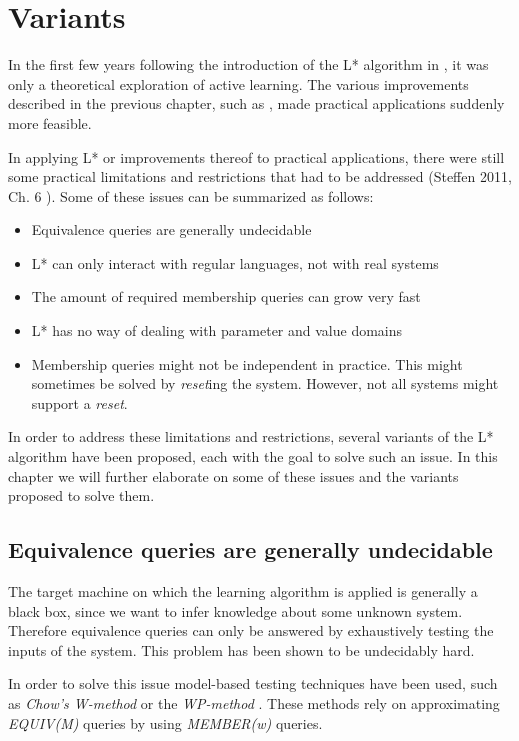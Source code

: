 \documentclass[multi,crop=false,class=article]{standalone}
\begin{document}
\section{Variants}
\label{sec:variants}
In the first few years following the introduction of the L* algorithm in
\cite{Angluin87}, it was only a theoretical exploration of active learning.
The various improvements described in the previous chapter,
such as ,
made practical applications suddenly more feasible.

In applying L* or improvements thereof to practical applications,
there were still some practical limitations and restrictions that had to
be addressed (Steffen 2011, Ch. 6 \cite{Steffen11}).
Some of these issues can be summarized as follows:
\begin{itemize}
  \item Equivalence queries are generally undecidable
  \item L* can only interact with regular languages, not with real systems
  \item The amount of required membership queries can grow very fast
  \item L* has no way of dealing with parameter and value domains
  \item Membership queries might not be independent in practice.
        This might sometimes be solved by \textit{reset}ing the system.
        However, not all systems might support a \textit{reset}.
\end{itemize}

In order to address these limitations and restrictions,
several variants of the L* algorithm have been proposed,
each with the goal to solve such an issue.
In this chapter we will further elaborate on some of these issues
and the variants proposed to solve them.

\subsection{Equivalence queries are generally undecidable}
The target machine on which the learning algorithm is applied is generally
a black box, since we want to infer knowledge about some unknown system.
Therefore equivalence queries can only be answered by exhaustively testing
the inputs of the system. This problem has been shown to be undecidably hard.

In order to solve this issue model-based testing techniques have been used,
such as \textit{Chow's W-method} or the \textit{WP-method} .
These methods rely on approximating \textit{EQUIV(M)} queries by using
\textit{MEMBER(w)} queries.
\end{document}
